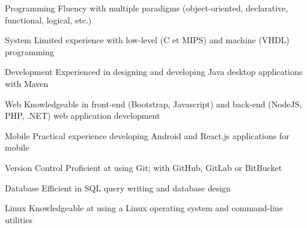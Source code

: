 

\begin{cvskills}

  \cvskill
    {Programming} %
    {Fluency with multiple paradigms (object-oriented, declarative, functional, logical, etc.)}

  \cvskill
    {System} %
    {Limited experience with low-level (C et MIPS) and machine (VHDL) programming}

  \cvskill
    {Development} %
    {Experienced in designing and developing Java desktop applications with Maven}
    
  \cvskill
    {Web} %
    {Knowledgeable in front-end (Bootstrap, Javascript) and back-end (NodeJS, PHP, .NET) web application development}
  
  \cvskill
    {Mobile} %
    {Practical experience developing Android and React.js applications for mobile}
    
  \cvskill
    {Version Control} %
    {Proficient at using Git; with GitHub, GitLab or BitBucket}
    
  \cvskill
    {Database} %
    {Efficient in SQL query writing and database design}
    
  \cvskill
    {Linux} %
    {Knowledgeable at using a Linux operating system and command-line utilities}

\end{cvskills}
